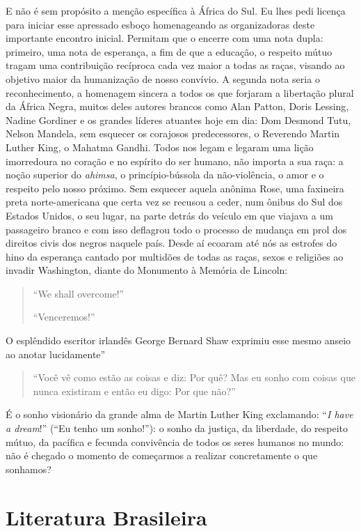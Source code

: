 \documentclass[
  letterpaper,
  DIV=11,
  numbers=noendperiod]{scrreprt}
\begin{document}
E não é sem propósito a menção específica à África do Sul. Eu lhes pedi
licença para iniciar esse apressado esboço homenageando as organizadoras
deste importante encontro inicial. Permitam que o encerre com uma nota
dupla: primeiro, uma nota de esperança, a fim de que a educação, o
respeito mútuo tragam uma contribuição recíproca cada vez maior a todas
as raças, visando ao objetivo maior da humanização de nosso convívio. A
segunda nota seria o reconhecimento, a homenagem sincera a todos os que
forjaram a libertação plural da África Negra, muitos deles autores
brancos como Alan Patton, Doris Lessing, Nadine Gordiner e os grandes
líderes atuantes hoje em dia: Dom Desmond Tutu, Nelson Mandela, sem
esquecer os corajosos predecessores, o Reverendo Martin Luther King, o
Mahatma Gandhi. Todos nos legam e legaram uma lição imorredoura no
coração e no espírito do ser humano, não importa a sua raça: a noção
superior do \emph{ahimsa}, o princípio-bússola da não-violência, o amor
e o respeito pelo nosso próximo. Sem esquecer aquela anônima Rose, uma
faxineira preta norte-americana que certa vez se recusou a ceder, num
ônibus do Sul dos Estados Unidos, o seu lugar, na parte detrás do
veículo em que viajava a um passageiro branco e com isso deflagrou todo
o processo de mudança em prol dos direitos civis dos negros naquele
país. Desde aí ecoaram até nós as estrofes do hino da esperança cantado
por multidões de todas as raças, sexos e religiões ao invadir
Washington, diante do Monumento à Memória de Lincoln:

\begin{quote}
``We shall overcome!''~

``Venceremos!''
\end{quote}

O esplêndido escritor irlandês George Bernard Shaw exprimiu esse mesmo
anseio ao anotar lucidamente''

\begin{quote}
``Você vê como estão as coisas e diz: Por quê? Mas eu sonho com coisas
que nunca existiram e então eu digo: Por que não?''
\end{quote}

É o sonho visionário da grande alma de Martin Luther King exclamando:
``\emph{I have a dream}!'' (``Eu tenho um sonho!''): o sonho da justiça,
da liberdade, do respeito mútuo, da pacífica e fecunda convivência de
todos os seres humanos no mundo: não é chegado o momento de começarmos a
realizar concretamente o que sonhamos?

\part{Literatura Brasileira}
\end{document}
